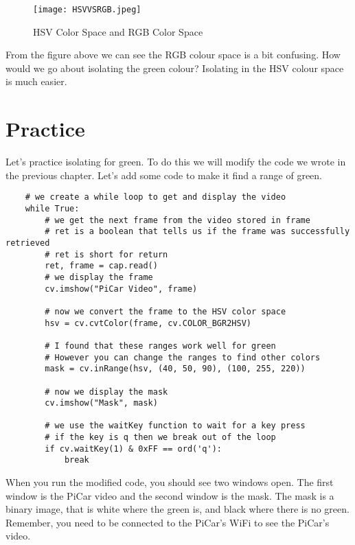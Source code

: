 \documentclass[11pt]{report}
\begin{document}
\begin{figure}[htbp]
    \centering
    \texttt{[image: HSVVSRGB.jpeg]}
    \caption{HSV Color Space and RGB Color Space}
    \label{fig:HSVVSRGB}
\end{figure}

From the figure above we can see the RGB colour space is a bit confusing. How would we go about isolating the green colour? 
Isolating in the HSV colour space is much easier.

\section{Practice}
Let's practice isolating for green. To do this we will modify the code we wrote in the previous chapter. Let's add some code to make it find a range of green.

\begin{verbatim}
    # we create a while loop to get and display the video
    while True:
        # we get the next frame from the video stored in frame
        # ret is a boolean that tells us if the frame was successfully retrieved
        # ret is short for return
        ret, frame = cap.read()
        # we display the frame
        cv.imshow("PiCar Video", frame)

        # now we convert the frame to the HSV color space
        hsv = cv.cvtColor(frame, cv.COLOR_BGR2HSV)

        # I found that these ranges work well for green
        # However you can change the ranges to find other colors
        mask = cv.inRange(hsv, (40, 50, 90), (100, 255, 220))

        # now we display the mask
        cv.imshow("Mask", mask)

        # we use the waitKey function to wait for a key press
        # if the key is q then we break out of the loop
        if cv.waitKey(1) & 0xFF == ord('q'):
            break

\end{verbatim}

When you run the modified code, you should see two windows open. The first window is the PiCar video and the second window is the mask. The mask is a binary image, that is white where the green is, and black where there is no green. Remember, you need to be connected to the PiCar's WiFi to see the PiCar's video.

\end{document}
